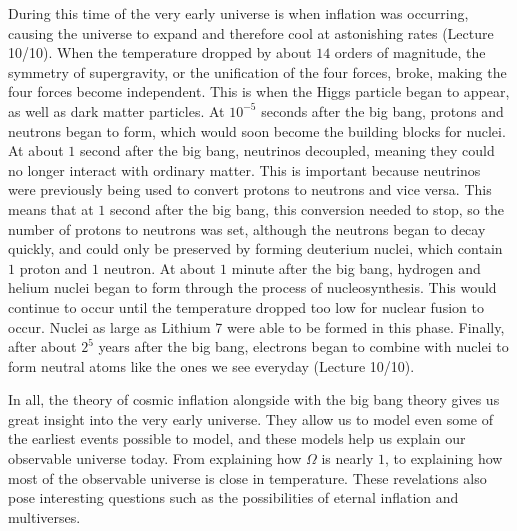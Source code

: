 \documentclass[12pt]{article}
\begin{document}
During this time of the very early universe is when inflation was occurring,
causing the universe to expand and therefore cool at astonishing rates (Lecture
10/10).  When
the temperature dropped by about $14$ orders of magnitude, the symmetry of
supergravity, or the unification of the four forces, broke, making the four
forces become independent.  This is when the Higgs particle began to appear, as
well as dark matter particles. At $10^{-5}$ seconds after the big bang, protons
and neutrons began to form, which would soon become the building blocks for
nuclei.  At about $1$ second after the big bang, neutrinos decoupled, meaning
they could no longer interact with ordinary matter.  This is important because
neutrinos were previously being used to convert protons to neutrons and vice
versa.  This means that at $1$ second after the big bang, this conversion needed
to stop, so the number of protons to neutrons was set, although the neutrons
began to decay quickly, and could only be preserved by forming deuterium
nuclei, which contain $1$ proton and $1$ neutron.  At about $1$ minute after the
big bang, hydrogen and helium nuclei began to form through the process of
nucleosynthesis.  This would continue to occur until the temperature dropped
too low for nuclear fusion to occur.  Nuclei as large as Lithium 7 were able to
be formed in this phase.  Finally, after about $2^{5}$ years after the big
bang, electrons began to combine with nuclei to form neutral atoms like the ones
we see everyday (Lecture 10/10).

In all, the theory of cosmic inflation alongside with the big bang theory gives
us great insight into the very early universe.  They allow us to model even some
of the earliest events possible to model, and these models help us explain our
observable universe today. From explaining how $\Omega$ is nearly $1$, to
explaining how most of the observable universe is close in temperature.  These
revelations also pose interesting questions such as the possibilities of eternal
inflation and multiverses.
\end{document}

